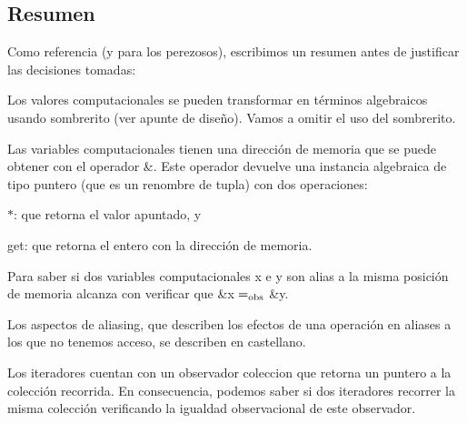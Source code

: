 \hypertarget{Aliasing_sec-Resumen}{}\subsection{Resumen}\label{Aliasing_sec-Resumen}
Como referencia (y para los perezosos), escribimos un resumen antes de justificar las decisiones tomadas\+:
\begin{DoxyItemize}
\item Los valores computacionales se pueden transformar en términos algebraicos usando sombrerito (ver apunte de diseño). Vamos a omitir el uso del sombrerito.
\item Las variables computacionales tienen una dirección de memoria que se puede obtener con el operador \&. Este operador devuelve una instancia algebraica de tipo puntero (que es un renombre de tupla) con dos operaciones\+:
\begin{DoxyEnumerate}
\item \textquotesingle{}$\ast$\textquotesingle{}\+: que retorna el valor apuntado, y
\item \textquotesingle{}get\textquotesingle{}\+: que retorna el entero con la dirección de memoria.
\end{DoxyEnumerate}
\item Para saber si dos variables computacionales {\ttfamily x} e {\ttfamily y} son alias a la misma posición de memoria alcanza con verificar que \&{\ttfamily x} $=_{\rm obs}$ \&{\ttfamily y}.
\item Los aspectos de aliasing, que describen los efectos de una operación en aliases a los que no tenemos acceso, se describen en castellano.
\item Los iteradores cuentan con un observador {\ttfamily coleccion} que retorna un puntero a la colección recorrida. En consecuencia, podemos saber si dos iteradores recorrer la misma colección verificando la igualdad observacional de este observador.
\end{DoxyItemize}

